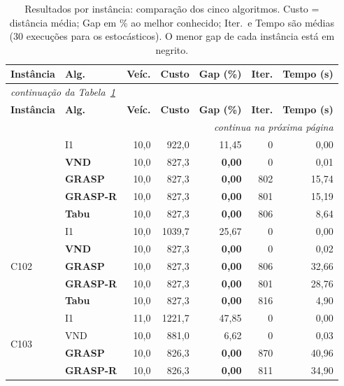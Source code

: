 {\footnotesize
\begin{longtable}{llrrrrr}
\caption{Resultados por instância: comparação dos cinco algoritmos. Custo = distância média; Gap em \% ao melhor conhecido; Iter.\ e Tempo são médias (30 execuções para os estocásticos). O menor gap de cada instância está em negrito.}\label{tab:porinstancia}\\
\toprule
\textbf{Instância} & \textbf{Alg.} & \textbf{Veíc.} & \textbf{Custo} & \textbf{Gap (\%)} & \textbf{Iter.} & \textbf{Tempo (s)} \\
\midrule
\endfirsthead
\multicolumn{7}{l}{\footnotesize\itshape continuação da Tabela~\ref{tab:porinstancia}}\\
\toprule
\textbf{Instância} & \textbf{Alg.} & \textbf{Veíc.} & \textbf{Custo} & \textbf{Gap (\%)} & \textbf{Iter.} & \textbf{Tempo (s)} \\
\midrule
\endhead
\midrule \multicolumn{7}{r}{\footnotesize\itshape continua na próxima página}\\
\endfoot
\bottomrule
\endlastfoot
\multirow{5}{*}{C101}
  & I1 & 10,0 & 922,0 & 11,45 & 0 & 0,00 \\
  & \textbf{VND} & 10,0 & 827,3 & \textbf{0,00} & 0 & 0,01 \\
  & \textbf{GRASP} & 10,0 & 827,3 & \textbf{0,00} & 802 & 15,74 \\
  & \textbf{GRASP-R} & 10,0 & 827,3 & \textbf{0,00} & 801 & 15,19 \\
  & \textbf{Tabu} & 10,0 & 827,3 & \textbf{0,00} & 806 & 8,64 \\
\midrule
\multirow{5}{*}{C102}
  & I1 & 10,0 & 1039,7 & 25,67 & 0 & 0,00 \\
  & \textbf{VND} & 10,0 & 827,3 & \textbf{0,00} & 0 & 0,02 \\
  & \textbf{GRASP} & 10,0 & 827,3 & \textbf{0,00} & 806 & 32,66 \\
  & \textbf{GRASP-R} & 10,0 & 827,3 & \textbf{0,00} & 801 & 28,76 \\
  & \textbf{Tabu} & 10,0 & 827,3 & \textbf{0,00} & 816 & 4,90 \\
\midrule
\multirow{5}{*}{C103}
  & I1 & 11,0 & 1221,7 & 47,85 & 0 & 0,00 \\
  & VND & 10,0 & 881,0 & 6,62 & 0 & 0,03 \\
  & \textbf{GRASP} & 10,0 & 826,3 & \textbf{0,00} & 870 & 40,96 \\
  & \textbf{GRASP-R} & 10,0 & 826,3 & \textbf{0,00} & 811 & 34,90 \\

\end{longtable}}
